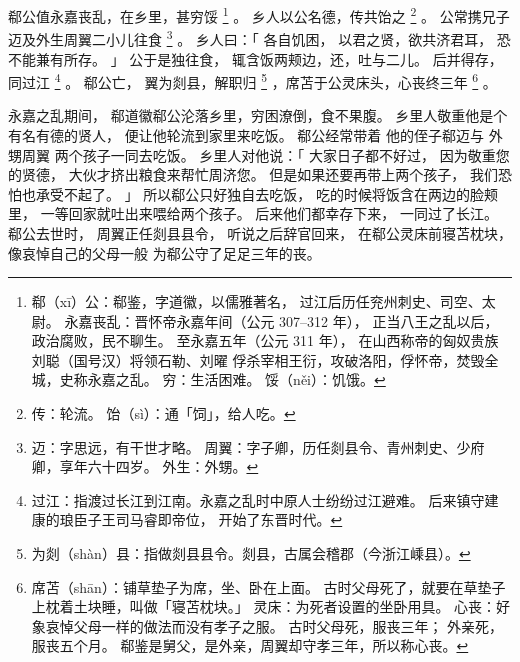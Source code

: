 
\switchcolumn*[\section{}]

郗公值永嘉丧乱，在乡里，甚穷馁%
\footnote{%
    郗（xī）公：郗鉴，字道徽，以儒雅著名，
                过江后历任兖州刺史、司空、太尉。
    永嘉丧乱：晋怀帝永嘉年间（公元 307--312 年），
              正当八王之乱以后，政治腐败，民不聊生。
              至永嘉五年（公元 311 年），
              在山西称帝的匈奴贵族刘聪（国号汉）将领石勒、刘曜
              俘杀宰相王衍，攻破洛阳，俘怀帝，焚毁全城，史称永嘉之乱。
    穷：生活困难。
    馁（něi）：饥饿。
}%
。
乡人以公名德，传共饴之%
\footnote{%
    传：轮流。
    饴（sì）：通「饲」，给人吃。
}%
。
公常携兄子迈及外生周翼二小儿往食%
\footnote{%
    迈：字思远，有干世才略。
    周翼：字子卿，历任剡县令、青州刺史、少府卿，享年六十四岁。
    外生：外甥。
}%
。
乡人曰：「
    各自饥困，
    以君之贤，欲共济君耳，
    恐不能兼有所存。
」
公于是独往食，
辄含饭两颊边，还，吐与二儿。
后并得存，同过江%
\footnote{%
    过江：指渡过长江到江南。永嘉之乱时中原人士纷纷过江避难。
          后来镇守建康的琅臣子王司马睿即帝位，
          开始了东晋时代。
}%
。
郗公亡，
翼为剡县，解职归%
\footnote{%
    为剡（shàn）县：指做剡县县令。剡县，古属会稽郡（今浙江嵊县）。
}%
，席苫于公灵床头，心丧终三年%
\footnote{%
    席苫（shān）：铺草垫子为席，坐、卧在上面。
                  古时父母死了，就要在草垫子上枕着土块睡，叫做「寝苫枕块。」
    灵床：为死者设置的坐卧用具。
    心丧：好象哀悼父母一样的做法而没有孝子之服。
          古时父母死，服丧三年；
          外亲死，服丧五个月。
          郗鉴是舅父，是外亲，周翼却守孝三年，所以称心丧。
}%
。

\switchcolumn

永嘉之乱期间，
郗道徽郗公沦落乡里，穷困潦倒，食不果腹。
乡里人敬重他是个有名有德的贤人，
便让他轮流到家里来吃饭。
郗公经常带着
    他的侄子郗迈与
    外甥周翼
两个孩子一同去吃饭。
乡里人对他说：「
    大家日子都不好过，
    因为敬重您的贤德，
    大伙才挤出粮食来帮忙周济您。
    但是如果还要再带上两个孩子，
    我们恐怕也承受不起了。
」
所以郗公只好独自去吃饭，
吃的时候将饭含在两边的脸颊里，
一等回家就吐出来喂给两个孩子。
后来他们都幸存下来，
一同过了长江。
郗公去世时，
周翼正任剡县县令，
听说之后辞官回来，
在郗公灵床前寝苫枕块，
像哀悼自己的父母一般
为郗公守了足足三年的丧。

